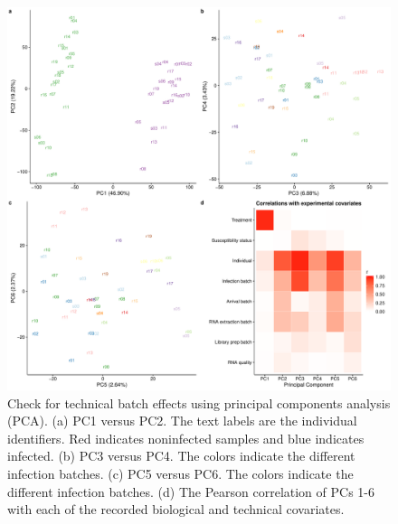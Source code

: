 \documentclass[fleqn,10pt]{wlscirep}
\begin{document}
\begin{figure}[ht]
\centering
\includegraphics[width=\linewidth]{../figure/batch-pca.pdf}
\caption{
Check for technical batch effects using principal components analysis (PCA). (a) PC1 versus PC2. The text labels are the individual identifiers. Red indicates noninfected samples and blue indicates infected. (b) PC3 versus PC4. The colors indicate the different infection batches. (c) PC5 versus PC6. The colors indicate the different infection batches. (d) The Pearson correlation of PCs 1-6 with each of the recorded biological and technical covariates.
}
\label{fig:batch}
\end{figure}
\end{document}

